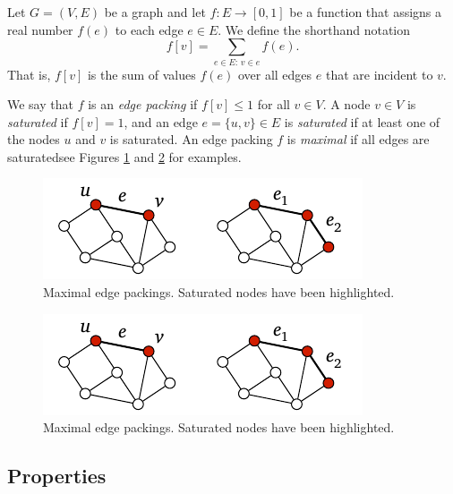 Let $G = (V,E)$ be a graph and let $f\colon E \to [0,1]$ be a function that assigns a real number $f(e)$ to each edge $e \in E$. We define the shorthand notation
\[
    f[v] = \sum_{e \in E :\, v \in e} f(e).
\]
That is, $f[v]$ is the sum of values $f(e)$ over all edges $e$ that are incident to $v$.

We say that $f$ is an \emph{edge packing} if $f[v] \le 1$ for all $v \in V$. A node $v \in V$ is \emph{saturated} if $f[v] = 1$, and an edge $e = \{u,v\} \in E$ is \emph{saturated} if at least one of the nodes $u$ and $v$ is saturated. An edge packing $f$ is \emph{maximal} if all edges are saturated\mydash see Figures \ref{fig:mep} and \ref{fig:mepb} for examples.

\begin{figure}
    \centering
    \includegraphics[page=\PMep]{figs.pdf}
    \caption{Maximal edge packings. Saturated nodes have been highlighted.}\label{fig:mep}
\end{figure}

\begin{figure}
    \centering
    \includegraphics[page=\PMepB]{figs.pdf}
    \caption{Maximal edge packings. Saturated nodes have been highlighted.}\label{fig:mepb}
\end{figure}


\subsection{Properties}

